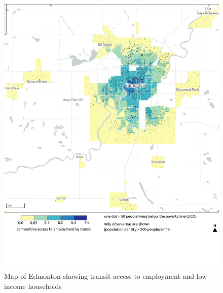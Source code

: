 \documentclass[11 pt, letterpaper]{article}
\begin{document}
{\begin{figure}[H]
	\caption{Map of Edmonton showing transit access to employment and low income households} 
	\label{a_van}
	\centerline{\includegraphics[width=6.5in]{figures/appendix_maps/a_edm.png}}
	\vspace{2mm}
\end{figure}

}
\end{document}
